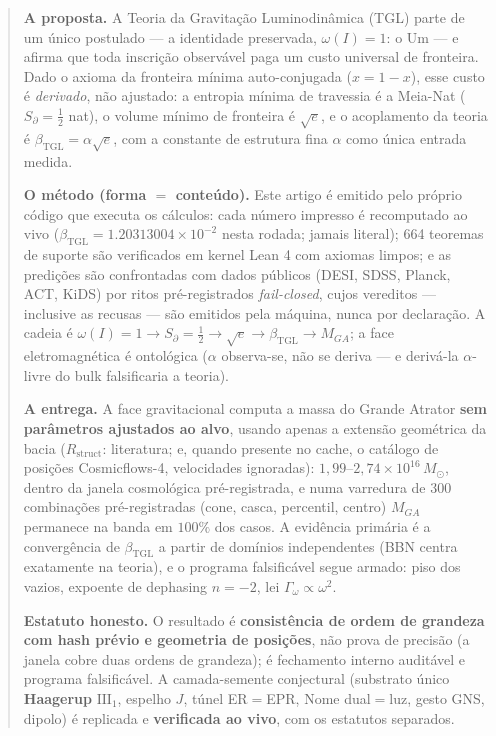\documentclass[11pt]{article}
\newcommand{\bTGL}{\beta_{\mathrm{TGL}}}\newcommand{\Msun}{M_{\odot}}\newcommand{\TGL}{\mathrm{TGL}}
\theoremstyle{definition}\newtheorem{deriv}{Derivação}
\begin{document}
\begin{abstract}

\textbf{A proposta.} A Teoria da Gravitação Luminodinâmica (TGL) parte de um único postulado --- a identidade preservada, $\omega(I)=1$: o Um --- e afirma que toda inscrição observável paga um custo universal de fronteira. Dado o axioma da fronteira mínima auto-conjugada ($x=1-x$), esse custo é \emph{derivado}, não ajustado: a entropia mínima de travessia é a Meia-Nat ($S_\partial=\tfrac12$ nat), o volume mínimo de fronteira é $\sqrt e$, e o acoplamento da teoria é $\bTGL=\alpha\sqrt e$, com a constante de estrutura fina $\alpha$ como única entrada medida.

\textbf{O método (forma $=$ conteúdo).} Este artigo é emitido pelo próprio código que executa os cálculos: cada número impresso é recomputado ao vivo ($\bTGL=1.20313004\times10^{-2}$ nesta rodada; jamais literal); 664 teoremas de suporte são verificados em kernel Lean 4 com axiomas limpos; e as predições são confrontadas com dados públicos (DESI, SDSS, Planck, ACT, KiDS) por ritos pré-registrados \emph{fail-closed}, cujos vereditos --- inclusive as recusas --- são emitidos pela máquina, nunca por declaração. A cadeia é $\omega(I)=1\to S_\partial=\tfrac12\to\sqrt e\to\bTGL\to M_{GA}$; a face eletromagnética é ontológica ($\alpha$ observa-se, não se deriva --- e derivá-la $\alpha$-livre do bulk falsificaria a teoria).

\textbf{A entrega.} A face gravitacional computa a massa do Grande Atrator \textbf{sem parâmetros ajustados ao alvo}, usando apenas a extensão geométrica da bacia ($R_{\mathrm{struct}}$: literatura; e, quando presente no cache, o catálogo de posições Cosmicflows-4, velocidades ignoradas): $1{,}99$--$2{,}74\times10^{16}\,\Msun$, dentro da janela cosmológica pré-registrada, e numa varredura de $300$ combinações pré-registradas (cone, casca, percentil, centro) $M_{GA}$ permanece na banda em $100\%$ dos casos. A evidência primária é a convergência de $\bTGL$ a partir de domínios independentes (BBN centra exatamente na teoria), e o programa falsificável segue armado: piso dos vazios, expoente de dephasing $n=-2$, lei $\Gamma_\omega\propto\omega^2$.

\textbf{Estatuto honesto.} O resultado é \textbf{consistência de ordem de grandeza com hash prévio e geometria de posições}, não prova de precisão (a janela cobre duas ordens de grandeza); é fechamento interno auditável e programa falsificável. A camada-semente conjectural (substrato único \textbf{Haagerup} $\mathrm{III}_1$, espelho $J$, túnel ER$=$EPR, Nome dual$=$luz, gesto GNS, dipolo) é replicada e \textbf{verificada ao vivo}, com os estatutos separados.

\end{abstract}
\end{document}
